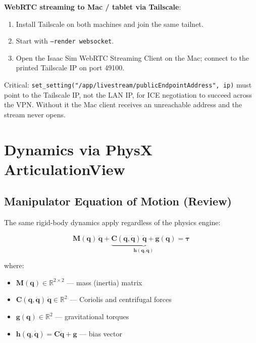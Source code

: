 \documentclass[11pt,a4paper]{article}
\newcommand{\bq}{\bm{q}}
\newcommand{\bdq}{\dot{\bm{q}}}
\newcommand{\bddq}{\ddot{\bm{q}}}
\newcommand{\btau}{\bm{\tau}}
\newcommand{\bM}{\bm{M}}
\newcommand{\bh}{\bm{h}}
\begin{document}
\begin{resultbox}
\textbf{WebRTC streaming to Mac / tablet via Tailscale}:
\begin{enumerate}[leftmargin=2em, itemsep=2pt]
    \item Install Tailscale on both machines and join the same tailnet.
    \item Start with \texttt{--render websocket}.
    \item Open the Isaac Sim WebRTC Streaming Client on the Mac; connect to the printed Tailscale IP on port 49100.
\end{enumerate}
Critical: \texttt{set\_setting("/app/livestream/publicEndpointAddress", ip)} must point to the Tailscale IP, not the LAN IP, for ICE negotiation to succeed across the VPN.  Without it the Mac client receives an unreachable address and the stream never opens.
\end{resultbox}


\section{Dynamics via PhysX ArticulationView}
\label{sec:dynamics}

\subsection{Manipulator Equation of Motion (Review)}

The same rigid-body dynamics apply regardless of the physics engine:

\begin{equation}
\boxed{
\bM(\bq)\,\bddq + \underbrace{\bm{C}(\bq, \bdq)\,\bdq + \bm{g}(\bq)}_{\bh(\bq, \bdq)} = \btau
}
\label{eq:eom}
\end{equation}

\noindent where:
\begin{itemize}[leftmargin=2em]
    \item $\bM(\bq) \in \mathbb{R}^{2\times 2}$ --- mass (inertia) matrix
    \item $\bm{C}(\bq, \bdq)\,\bdq \in \mathbb{R}^2$ --- Coriolis and centrifugal forces
    \item $\bm{g}(\bq) \in \mathbb{R}^2$ --- gravitational torques
    \item $\bh(\bq, \bdq) = \bm{C}\bdq + \bm{g}$ --- bias vector
\end{itemize}
\end{document}
